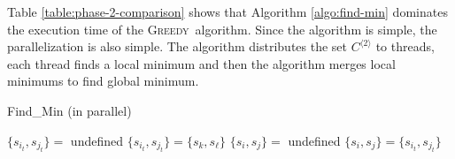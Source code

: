 \documentclass[12pt]{article}
\newcommand{\greedyAlgo}{\textsc{Greedy}}
\begin{document}
\begin{table}[ht]
	\center
	\caption{Comparison of Execution time of the Algorithm \ref{algo:find-min}($t_{FIND\_MIN}$) and the second phase ($t_{SECOND\_PHASE}$)}
	\label{table:phase-2-comparison}
\end{table}

Table \ref{table:phase-2-comparison} shows that Algorithm \ref{algo:find-min} dominates the execution time of the \greedyAlgo\ algorithm. Since the algorithm is simple, the parallelization is also simple. The algorithm distributes the set $C^{\langle 2 \rangle}$ to threads, each thread finds a local minimum and then the algorithm merges local minimums to find global minimum.



\begin{algorithm}[ht]
	\caption{Find\_Min (in parallel)}
	\label{algo:find-min-parallel}
	
	{
	$\{ s_{i_t},s_{j_t} \} =$ undefined
	}
	{
		{
			$\{ s_{i_t},s_{j_t} \} = \{ s_k, s_\ell \}$
		}
	}
	$\{ s_i,s_j \} =$ undefined\;
	{
		{
			$\{ s_i,s_j \} = \{ s_{i_t},s_{j_t} \}$
		}
	}
\end{algorithm}
\end{document}
